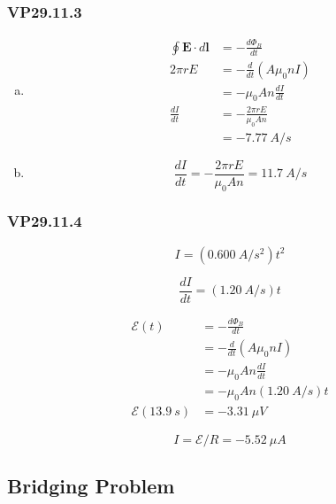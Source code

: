 \documentclass{article}
\begin{document}
\subsubsection{VP29.11.3}

\begin{enumerate}[(a)]
  \item

        \begin{align*}
          \oint \mathbf{E} \cdot d \mathbf{l} & = -\frac{d \Phi_B}{dt}         \\
          2 \pi r E                           & = -\frac{d}{dt} (A \mu_0 n I)  \\
                                              & = -\mu_0 A n \frac{dI}{dt}     \\
          \frac{dI}{dt}                       & = -\frac{2 \pi r E}{\mu_0 A n} \\
                                              & = -\qty{7.77}{A/s}
        \end{align*}

  \item \[\frac{dI}{dt} = -\frac{2 \pi r E}{\mu_0 A n} = \qty{11.7}{A/s}\]
\end{enumerate}

\subsubsection{VP29.11.4}

\[I = (\qty{0.600}{A/s^2}) t^2\]

\[\frac{dI}{dt} = (\qty{1.20}{A/s}) t\]

\begin{align*}
  \mathcal{E}(t)             & = -\frac{d \Phi_B}{dt}           \\
                             & = -\frac{d}{dt} (A \mu_0 n I)    \\
                             & = -\mu_0 A n \frac{dI}{dt}       \\
                             & = -\mu_0 A n (\qty{1.20}{A/s}) t \\
  \mathcal{E}(\qty{13.9}{s}) & = \qty{-3.31}{\mu V}
\end{align*}

\[I = \mathcal{E} / R = \qty{-5.52}{\mu A}\]

\subsection{Bridging Problem}
\end{document}
